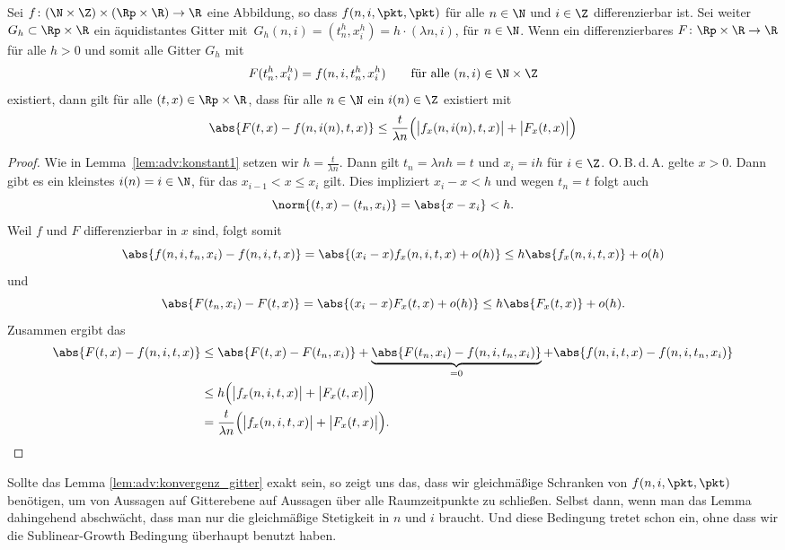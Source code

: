 \begin{lemma}\label{lem:adv:konvergenz_gitter}
Sei $f\colon (\N \times \Z) \times (\Rp \times \R) \to \R$ eine Abbildung, so dass $f(n,i,\pkt,\pkt)$ für alle $n \in \N$ und $i \in \Z$ differenzierbar ist.
Sei weiter\, $G_h \subset \Rp \times \R$ ein äquidistantes Gitter mit\, $G_h(n,i) = (t^h_n, x^h_i) = h \cdot (\lambda n, i)$, für $n \in \N$.
Wenn ein differenzierbares $F\colon \Rp \times \R \to \R$ für alle $h > 0$ und somit alle Gitter $G_h$ mit
\begin{align}\label{eq:lemma:diag:voraussetzung}
F(t^h_n, x^h_i) = f(n, i, t^h_n, x^h_i) \qquad \text{für alle $(n,i) \in \N \times \Z$}
\end{align}
existiert, dann gilt für alle $(t, x) \in \Rp \times \R$, dass für alle $n \in \N$ ein $i(n) \in \Z$ existiert mit
\begin{align}\label{eq:lemma:diag:aussage}
\abs{F(t, x) - f(n, i(n), t, x)} \leq \frac {t}{\lambda n} \Bigl(\bigl\lvert f_x(n, i(n), t, x) \bigr\rvert + \bigl\lvert F_x(t, x) \bigr\rvert \Bigr)
\end{align}
\end{lemma}
\begin{proof}
Wie in Lemma~\ref{lem:adv:konstant1} setzen wir $h = \frac {t}{\lambda n}$.
Dann gilt $t_n = \lambda n h = t$ und $x_i = i h$ für $i \in \Z$.
O.\,B.\,d.\,A. gelte $x > 0$.
Dann gibt es ein kleinstes $i(n) = i \in \N$, für das $x_{i-1} < x \leq x_i$ gilt.
Dies impliziert $x_i - x < h$ und wegen $t_n = t$ folgt auch
\[ \norm{(t,x) - (t_n, x_i)} = \abs{x - x_i} < h. \]
Weil $f$ und $F$ differenzierbar in $x$ sind, folgt somit
\[ \abs{f(n, i, t_n, x_i) - f(n, i, t, x)} = \abs{(x_i - x) f_x(n, i, t, x) + o(h)} \leq h \abs{f_x(n, i, t, x)} + o(h) \]
und
\[ \abs{F(t_n, x_i) - F(t, x)} = \abs{(x_i - x) F_x(t, x) + o(h)} \leq h \abs{F_x(t, x)} + o(h). \]
Zusammen ergibt das
{\small
\begin{align*}
\abs{F(t,x) - f(n, i, t, x)} &\leq \abs{F(t, x) - F(t_n, x_i)} + \underbrace{\abs{F(t_n, x_i) - f(n, i, t_n, x_i)}}_{= 0} + \abs{f(n,i, t, x) - f(n, i, t_n, x_i)}\\
&\leq h \Bigl(\bigl\lvert f_x(n, i, t, x) \bigr\rvert + \bigl\lvert F_x(t, x) \bigr\rvert \Bigr)\\
&= \frac {t}{\lambda n} \Bigl(\bigl\lvert f_x(n, i, t, x) \bigr\rvert + \bigl\lvert F_x(t, x) \bigr\rvert \Bigr). \qedhere
\end{align*}
}
\end{proof}
Sollte das Lemma \ref{lem:adv:konvergenz_gitter} exakt sein, so zeigt uns das, dass wir gleichmäßige Schranken von $f(n, i, \pkt, \pkt)$ benötigen, um von Aussagen auf Gitterebene auf Aussagen über alle Raumzeitpunkte zu schließen.
Selbst dann, wenn man das Lemma dahingehend abschwächt, dass man nur die gleichmäßige Stetigkeit in $n$ und $i$ braucht.
Und diese Bedingung tretet schon ein, ohne dass wir die Sublinear-Growth Bedingung überhaupt benutzt haben.